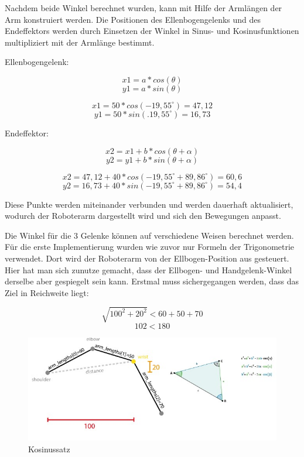 \documentclass[12pt]{article}
\begin{document}
    

    Nachdem beide Winkel berechnet wurden, kann mit Hilfe der Armlängen der Arm konstruiert werden.
    Die Positionen des Ellenbogengelenks und des Endeffektors werden durch Einsetzen der Winkel in
    Sinus- und Kosinusfunktionen multipliziert mit der Armlänge bestimmt.

    Ellenbogengelenk:

    \[
        x1 = a * cos(\theta)
    \]
    \[
        y1 = a * sin(\theta)
    \]

    \[
        x1 = 50 * cos(-19,55^\circ) = 47,12
    \]
    \[
        y1 = 50 * sin(.19,55^\circ) = 16,73
    \]

    Endeffektor:

    \[
        x2 = x1 + b * cos(\theta + \alpha)
    \]
    \[
        y2 = y1 + b * sin(\theta + \alpha)
    \]

    \[
        x2 = 47,12 + 40 * cos(-19,55^\circ + 89,86^\circ) = 60,6
    \]
    \[
        y2 = 16,73 + 40 * sin(-19,55^\circ + 89,86^\circ) = 54,4
    \]

    Diese Punkte werden miteinander verbunden und werden dauerhaft aktualisiert, wodurch der
    Roboterarm dargestellt wird und sich den Bewegungen anpasst.

    

    Die Winkel für die 3 Gelenke können auf verschiedene Weisen berechnet werden. Für die erste
    Implementierung wurden wie zuvor nur Formeln der Trigonometrie verwendet. Dort wird der
    Roboterarm von der Ellbogen-Position aus gesteuert. Hier hat man sich zunutze gemacht, dass
    der Ellbogen- und Handgelenk-Winkel derselbe aber gespiegelt sein kann.
    Erstmal muss sichergegangen werden, dass das Ziel in Reichweite liegt:

    \[
        \sqrt{100^2 + 20^2} < 60 + 50 +70
    \]
    \[
        102 < 180
    \]

    

    \begin{figure}[h]
        \centering
        \includegraphics[width = \linewidth]{Bild 4}
        \caption{Kosinussatz}
    \end{figure}
\end{document}

